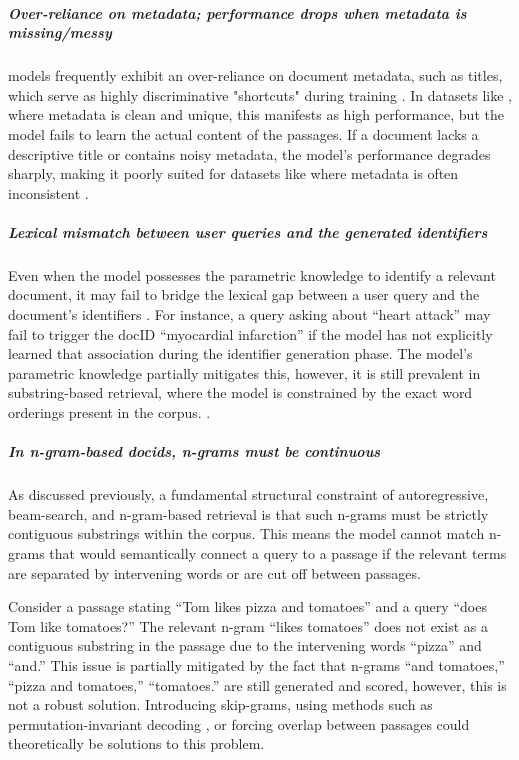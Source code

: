 \subparagraph{Over-reliance on metadata; performance drops when metadata is missing/messy}
 models frequently exhibit an over-reliance on document metadata, such as titles, which serve as highly discriminative "shortcuts" during training \cite{michele-bevilacqua-autoregressive-search, yongqi-li-multiview-identifiers}. In datasets like , where metadata is clean and unique, this manifests as high performance, but the model fails to learn the actual content of the passages. If a document lacks a descriptive title or contains noisy metadata, the model's performance degrades sharply, making it poorly suited for datasets like  where metadata is often inconsistent \cite{payal-bajaj-ms-marco}.

\subparagraph{Lexical mismatch between user queries and the generated identifiers}
Even when the model possesses the parametric knowledge to identify a relevant document, it may fail to bridge the lexical gap between a user query and the document's identifiers \cite{yuan-liu-on-the}. For instance, a query asking about ``heart attack'' may fail to trigger the docID ``myocardial infarction'' if the model has not explicitly learned that association during the identifier generation phase. The model's parametric knowledge partially mitigates this, however, it is still prevalent in substring-based retrieval, where the model is constrained by the exact word orderings present in the corpus. \cite{michele-bevilacqua-autoregressive-search}.


\subparagraph{In n-gram-based docids, n-grams must be continuous}
As discussed previously, a fundamental structural constraint of autoregressive, beam-search, and n-gram-based retrieval is that such n-grams must be strictly contiguous substrings within the corpus. This means the model cannot match n-grams that would semantically connect a query to a passage if the relevant terms are separated by intervening words or are cut off between passages.

Consider a passage stating ``Tom likes pizza and tomatoes'' and a query ``does Tom like tomatoes?'' The relevant n-gram ``likes tomatoes'' does not exist as a contiguous substring in the passage due to the intervening words ``pizza'' and ``and.''  This issue is partially mitigated by the fact that n-grams ``and tomatoes,'' ``pizza and tomatoes,'' ``tomatoes.'' are still generated and scored, however, this is not a robust solution. Introducing skip-grams, using methods such as permutation-invariant decoding \cite{peitian-zhang-generative-retrieval}, or forcing overlap between passages could theoretically be solutions to this problem.

